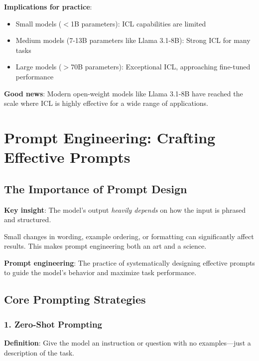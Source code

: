 \documentclass{article}
\begin{document}
\textbf{Implications for practice}:
\begin{itemize}
\item Small models ($<$1B parameters): ICL capabilities are limited
\item Medium models (7-13B parameters like Llama 3.1-8B): Strong ICL for many tasks
\item Large models ($>$70B parameters): Exceptional ICL, approaching fine-tuned performance
\end{itemize}

\textbf{Good news}: Modern open-weight models like Llama 3.1-8B have reached the scale where ICL is highly effective for a wide range of applications.

\section{Prompt Engineering: Crafting Effective Prompts}

\subsection{The Importance of Prompt Design}

\textbf{Key insight}: The model's output \textit{heavily depends} on how the input is phrased and structured.

Small changes in wording, example ordering, or formatting can significantly affect results. This makes prompt engineering both an art and a science.

\begin{center}
\end{center}

\textbf{Prompt engineering}: The practice of systematically designing effective prompts to guide the model's behavior and maximize task performance.

\subsection{Core Prompting Strategies}

\subsubsection{1. Zero-Shot Prompting}

\textbf{Definition}: Give the model an instruction or question with no examples---just a description of the task.
\end{document}
